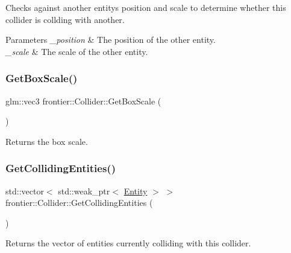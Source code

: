 Checks against another entity\textquotesingle{}s position and scale to determine whether this collider is collding with another. 


\begin{DoxyParams}{Parameters}
{\em \+\_\+position} & The position of the other entity. \\
\hline
{\em \+\_\+scale} & The scale of the other entity. \\
\hline
\end{DoxyParams}
\mbox{\label{classfrontier_1_1_collider_a2f8285a81d952b72bf0a02703f7d3481}} 
\subsubsection{\texorpdfstring{Get\+Box\+Scale()}{GetBoxScale()}}
{\footnotesize\ttfamily glm\+::vec3 frontier\+::\+Collider\+::\+Get\+Box\+Scale (\begin{DoxyParamCaption}{ }\end{DoxyParamCaption})}



Returns the box scale. 

\mbox{\label{classfrontier_1_1_collider_a95ae710a5b6e370fc79967ff650f2f6f}} 
\subsubsection{\texorpdfstring{Get\+Colliding\+Entities()}{GetCollidingEntities()}}
{\footnotesize\ttfamily std\+::vector$<$ std\+::weak\+\_\+ptr$<$ \hyperlink{classfrontier_1_1_entity}{Entity} $>$ $>$ frontier\+::\+Collider\+::\+Get\+Colliding\+Entities (\begin{DoxyParamCaption}{ }\end{DoxyParamCaption})}



Returns the vector of entities currently colliding with this collider. 

\mbox{\label{classfrontier_1_1_collider_abcc4976d3ac48d591a0e725fb457260a}} 
